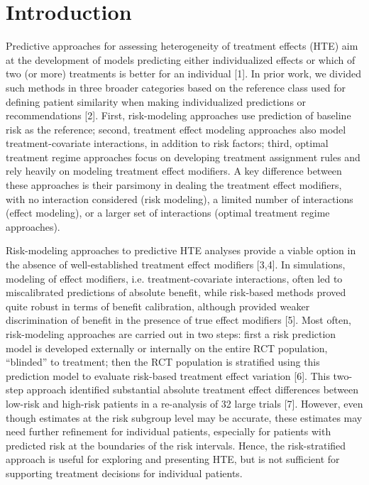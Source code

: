 \documentclass[]{elsarticle} %
\begin{document}
\doublespacing 
\linenumbers

\hypertarget{introduction}{%
\section{Introduction}\label{introduction}}

Predictive approaches for assessing heterogeneity of treatment effects
(HTE) aim at the development of models predicting either individualized
effects or which of two (or more) treatments is better for an individual
{[}1{]}. In prior work, we divided such methods in three broader
categories based on the reference class used for defining patient
similarity when making individualized predictions or recommendations
{[}2{]}. First, risk-modeling approaches use prediction of baseline risk
as the reference; second, treatment effect modeling approaches also
model treatment-covariate interactions, in addition to risk factors;
third, optimal treatment regime approaches focus on developing treatment
assignment rules and rely heavily on modeling treatment effect
modifiers. A key difference between these approaches is their parsimony
in dealing the treatment effect modifiers, with no interaction
considered (risk modeling), a limited number of interactions (effect
modeling), or a larger set of interactions (optimal treatment regime
approaches).

Risk-modeling approaches to predictive HTE analyses provide a viable
option in the absence of well-established treatment effect modifiers
{[}3,4{]}. In simulations, modeling of effect modifiers, i.e.
treatment-covariate interactions, often led to miscalibrated predictions
of absolute benefit, while risk-based methods proved quite robust in
terms of benefit calibration, although provided weaker discrimination of
benefit in the presence of true effect modifiers {[}5{]}. Most often,
risk-modeling approaches are carried out in two steps: first a risk
prediction model is developed externally or internally on the entire RCT
population, ``blinded'' to treatment; then the RCT population is
stratified using this prediction model to evaluate risk-based treatment
effect variation {[}6{]}. This two-step approach identified substantial
absolute treatment effect differences between low-risk and high-risk
patients in a re-analysis of 32 large trials {[}7{]}. However, even
though estimates at the risk subgroup level may be accurate, these
estimates may need further refinement for individual patients,
especially for patients with predicted risk at the boundaries of the
risk intervals. Hence, the risk-stratified approach is useful for
exploring and presenting HTE, but is not sufficient for supporting
treatment decisions for individual patients.
\end{document}
